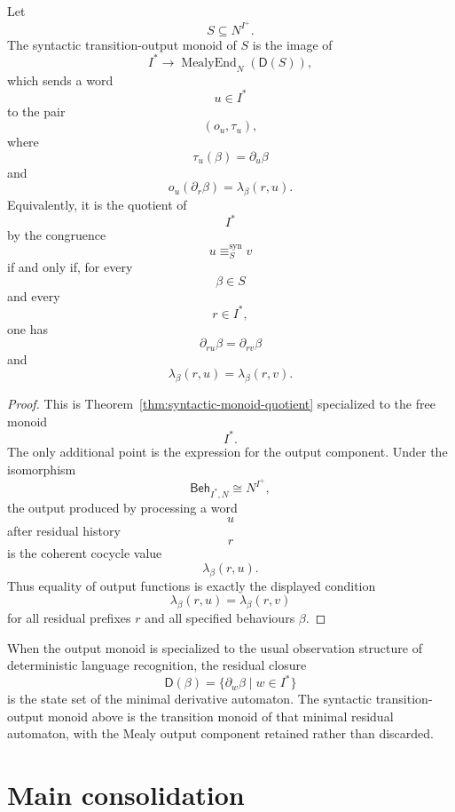 \begin{theorem}
\label{thm:free-input-syntactic-transition-output-monoid}
Let
\[
S\subseteq N^{I^+}.
\]
The syntactic transition-output monoid of \(S\) is the image of
\[
I^\ast
\to
\operatorname{MealyEnd}_N(\mathsf D(S)),
\]
which sends a word
\[
u\in I^\ast
\]
to the pair
\[
(o_u,\tau_u),
\]
where
\[
\tau_u(\beta)=\partial_u\beta
\]
and
\[
o_u(\partial_r\beta)=\lambda_\beta(r,u).
\]
Equivalently, it is the quotient of
\[
I^\ast
\]
by the congruence
\[
u\equiv_S^{\operatorname{syn}} v
\]
if and only if, for every
\[
\beta\in S
\]
and every
\[
r\in I^\ast,
\]
one has
\[
\partial_{ru}\beta=\partial_{rv}\beta
\]
and
\[
\lambda_\beta(r,u)=\lambda_\beta(r,v).
\]
\end{theorem}

\begin{proof}
This is Theorem~\ref{thm:syntactic-monoid-quotient} specialized to the free
monoid
\[
I^\ast.
\]
The only additional point is the expression for the output component. Under
the isomorphism
\[
\mathsf{Beh}_{I^\ast,N}\cong N^{I^+},
\]
the output produced by processing a word
\[
u
\]
after residual history
\[
r
\]
is the coherent cocycle value
\[
\lambda_\beta(r,u).
\]
Thus equality of output functions is exactly the displayed condition
\[
\lambda_\beta(r,u)=\lambda_\beta(r,v)
\]
for all residual prefixes \(r\) and all specified behaviours \(\beta\).
\end{proof}

\begin{remark}
\label{rem:free-input-classical-derivative-automata}
When the output monoid is specialized to the usual observation structure of
deterministic language recognition, the residual closure
\[
\mathsf D(\beta)
=
\{\partial_w\beta\mid w\in I^\ast\}
\]
is the state set of the minimal derivative automaton. The syntactic
transition-output monoid above is the transition monoid of that minimal
residual automaton, with the Mealy output component retained rather than
discarded.
\end{remark}

\section{Main consolidation}
\label{sec:canonical-residual-closure-main-consolidation}

